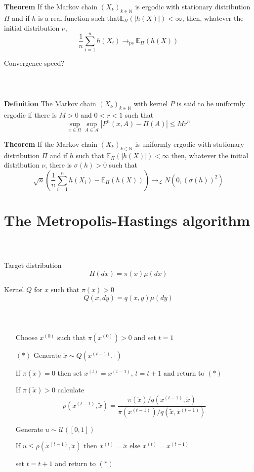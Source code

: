 \documentclass[notes,professionalfont,11pt,usenames,dvipsnames]{beamer}
\renewcommand{\mathcal}{\mathscr}
\renewcommand{\mathcal}{\mathscr}
\newcommand{\E}{\mathbb{E}}
\newcommand\justify{\rightskip0pt \leftskip0pt}
\newenvironment{slide}
{\begin{frame}[environment=slide]
\frametitle{\insertsection \\ \insertsubsection}\justify\setlength{\parskip}{0.5cm}\vspace{-0.5cm}}
{\end{frame}}
\begin{document}
\begin{slide}

{\bf Theorem} If the Markov chain $(X_k)_{k\in\mathbb{N}}$ is ergodic with 
stationary distribution $\Pi$ and if $h$ is a real function
such that$\E_\Pi(|h(X)|)<\infty$, then, whatever the initial distribution $\nu$,
$$
\frac{1}{n}\sum_{i=1}^n h(X_i) \longrightarrow_{\mbox{ps}} \E_\Pi(h(X))
$$


Convergence speed?

\end{slide}

\begin{slide}

{\bf Definition} The Markov chain $(X_k)_{k\in\mathbb{N}}$ with kernel $P$
is said to be uniformly ergodic if there is $M>0 $ and $0<r<1$ such that
$$
\sup_{x\in\Omega}\sup_{A\in\mathcal{A}}|P^n(x,A)-\Pi(A)|\leq Mr^n
$$


{\bf Theorem} If the Markov chain $(X_k)_{k\in\mathbb{N}}$ is uniformly ergodic with
stationary distribution $\Pi$ and if $h$ such that $\E_\Pi(|h(X)|)<\infty$ then,
whatever the initial distribution $\nu$, there is $\sigma(h)>0$ such that
$$
\sqrt{n}\left(\frac{1}{n}\sum_{i=1}^n h(X_i)-\E_\Pi(h(X))\right)\longrightarrow_{\mathcal{L}} N(0,(\sigma(h))^2)
$$

\end{slide}

\section{The Metropolis-Hastings algorithm}

\begin{slide}

Target distribution 
$$
\Pi(dx)=\pi(x)\mu(dx)
$$


Kernel $Q$ for $x$ such that $\pi(x)>0$ 
$$
Q(x,dy)=q(x,y)\mu(dy)
$$


\end{slide}

\begin{slide}

\begin{itemize}
\item[] Choose $x^{(0)}$ such that $\pi\left(x^{(0)}\right)>0$ and set $t=1$
\item[\color{black} $(*)$] Generate $\tilde x\sim Q(x^{(t-1)},\cdot)$
\item[] If $\pi(\tilde x)=0$ then set $x^{(t)}=x^{(t-1)}$, $t=t+1$ and return to $(*)$
\item[] If $\pi(\tilde x)>0$ calculate
$$
\rho(x^{(t-1)},\tilde x)=\frac{\pi(\tilde x)\big/q(x^{(t-1)},\tilde x)}{\pi(x^{(t-1)})\big/q(\tilde x,x^{(t-1)})}
$$
\item[] Generate $u\sim\mathcal{U}([0,1])$
\item[] If $u\leq \rho(x^{(t-1)},\tilde x)$ then $x^{(t)}=\tilde x$ else $x^{(t)}=x^{(t-1)}$
\item[] set $t=t+1$ and return to $(*)$
\end{itemize}

\end{slide}
\end{document}
